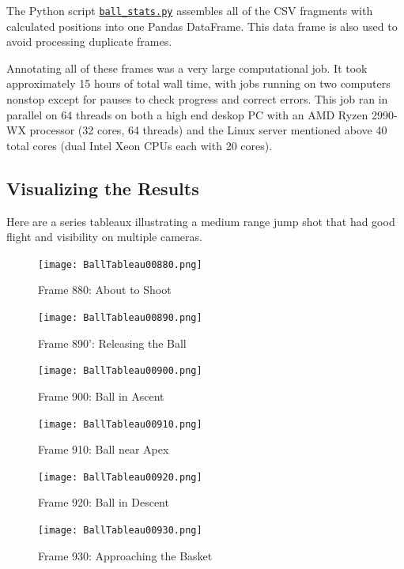 \documentclass{article}
\begin{document}
The Python script 
\href{https://github.com/Harvard-AM-205-Basketball/Basketball/blob/master/src/ball_stats.py}
{\texttt{ball\_stats.py}} assembles all of the CSV fragments with calculated positions
into one Pandas DataFrame.  This data frame is also used to avoid processing duplicate frames.

Annotating all of these frames was a very large computational job.  
It took approximately 15 hours of total wall time, with jobs running on two computers
nonstop except for pauses to check progress and correct errors.
This job ran in parallel on 64 threads on both a high end deskop PC with
an AMD Ryzen 2990-WX processor (32 cores, 64 threads) and 
the Linux server mentioned above 40 total cores (dual Intel Xeon CPUs each with 20 cores).

\newpage
\subsection{Visualizing the Results}

Here are a series tableaux illustrating a medium range jump shot 
that had good flight and visibility on multiple cameras.

\begin{figure}[H]
\center
\texttt{[image: BallTableau00880.png]}
\caption*{Frame 880: About to Shoot}
\end{figure}

\begin{figure}[H]
\center
\texttt{[image: BallTableau00890.png]}
\caption*{Frame 890': Releasing the Ball}
\end{figure}

\begin{figure}[H]
\center
\texttt{[image: BallTableau00900.png]}
\caption*{Frame 900: Ball in Ascent}
\end{figure}

\begin{figure}[H]
\center
\texttt{[image: BallTableau00910.png]}
\caption*{Frame 910: Ball near Apex}
\end{figure}

\begin{figure}[H]
\center
\texttt{[image: BallTableau00920.png]}
\caption*{Frame 920: Ball in Descent}
\end{figure}

\begin{figure}[H]
\center
\texttt{[image: BallTableau00930.png]}
\caption*{Frame 930: Approaching the Basket}
\end{figure}
\end{document}
